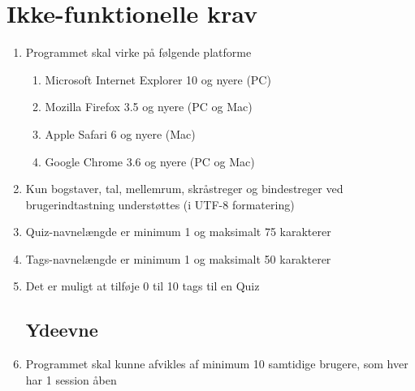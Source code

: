 \section{Ikke-funktionelle krav}
\label{sec:nonFunctional}
\begin{enumerate}
	\subsection*{Brugbarhed}
	\item Programmet skal virke på følgende platforme
	\begin{enumerate}
		\item Microsoft Internet Explorer 10 og nyere (PC)
		\item Mozilla Firefox 3.5 og nyere (PC og Mac)
		\item Apple Safari 6 og nyere (Mac)
		\item Google Chrome 3.6 og nyere (PC og Mac)
	\end{enumerate}
	
	\item Kun bogstaver, tal, mellemrum, skråstreger og bindestreger ved brugerindtastning understøttes (i UTF-8 formatering)
	\item Quiz-navnelængde er minimum 1 og maksimalt 75 karakterer
	\item Tags-navnelængde er minimum 1 og maksimalt 50 karakterer 
	\item Det er muligt at tilføje 0 til 10 tags til en Quiz
	\subsection*{Ydeevne}
	\item Programmet skal kunne afvikles af minimum 10 samtidige brugere, som hver har 1 session åben
\end{enumerate}